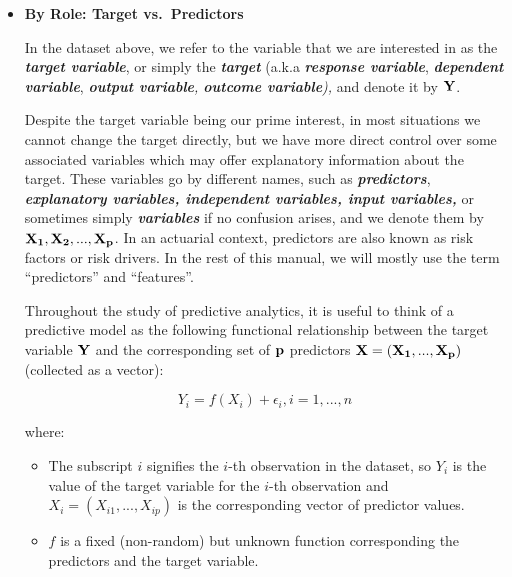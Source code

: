 \documentclass[
  12pt,
]{krantz}
\providecommand{\tightlist}{%
  \setlength{\itemsep}{0pt}\setlength{\parskip}{0pt}}
\begin{document}
\begin{itemize}
\item
  \textbf{By Role: Target vs.~Predictors}

  In the dataset above, we refer to the variable that we are interested in as
  the \textbf{\emph{target variable}}, or simply the \textbf{\emph{target}} (a.k.a \textbf{\emph{response
  variable}}, \textbf{\emph{dependent variable}}, \emph{\textbf{output variable}, \textbf{outcome
  variable}),} and denote it by \(\bf{Y}\).

  Despite the target variable being our prime interest, in most situations we
  cannot change the target directly, but we have more direct control over some
  associated variables which may offer explanatory information about the
  target. These variables go by different names, such as \textbf{\emph{predictors}},
  \textbf{\emph{explanatory variables, independent variables, input variables,}} or
  sometimes simply \textbf{\emph{variables}} if no confusion arises, and we denote them
  by \(\bf{X_1, X_2, ..., X_p}\). In an actuarial context, predictors are also
  known as risk factors or risk drivers. In the rest of this manual, we will
  mostly use the term ``predictors'' and ``features''.

  Throughout the study of predictive analytics, it is useful to think of a
  predictive model as the following functional relationship between the target
  variable \(\bf{Y}\) and the corresponding set of \(\bf{p}\) predictors
  \(\bf{X=(X_1,...,X_p)}\) (collected as a vector):

  \[
  \begin{equation}
  Y_i=f\left(X_i\right)+\epsilon_i, i=1,...,n
  \label{eq:modelformula}
  \end{equation}
  \]

  where:

  \begin{itemize}
  \tightlist
  \item
    The subscript \(i\) signifies the \(i\)-th observation in the dataset, so
    \(Y_i\) is the value of the target variable for the \(i\)-th observation and
    \(X_i = (X_{i1}, ..., X_{ip})\) is the corresponding vector of predictor
    values.
  \item
    \(f\) is a fixed (non-random) but unknown function corresponding the
    predictors and the target variable.


\end{itemize}
\end{itemize}
\end{document}
